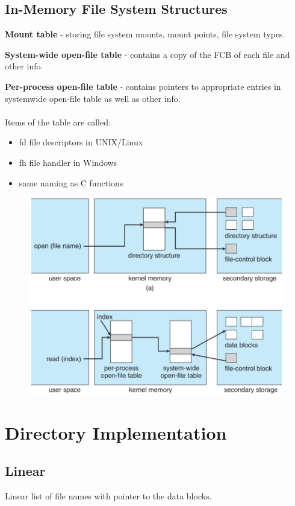 \subsection{In-Memory File System Structures}

\textbf{Mount table} - storing file system mounts, mount points, file system types.

\textbf{System-wide open-file table} - contains a copy of the FCB of each file and other
info.

\textbf{Per-process open-file table} - contains pointers to appropriate entries in systemwide open-file table as well as other info.

\paragraph{}

Items of the table are called:

\begin{itemize}
    \item fd file descriptors in UNIX/Linux
    \item fh file handler in Windows
    \item same naming as C functions
\end{itemize}

\begin{figure}[h!]
    \centering
    \includegraphics[width=0.5\linewidth]{img/mxfhg.png}
\end{figure}

\newpage
\section{Directory Implementation}

\subsection{Linear}

Linear list of file names with pointer to the data blocks.

